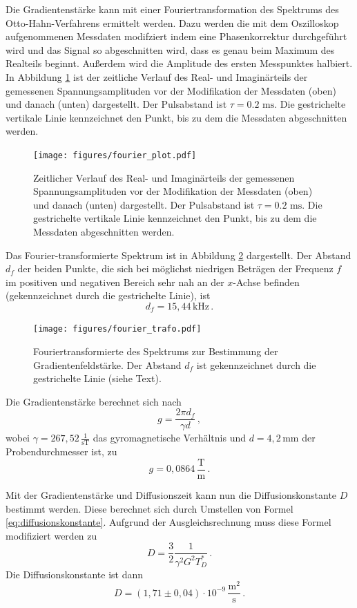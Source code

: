 Die Gradientenstärke kann mit einer Fouriertransformation
des Spektrums des Otto-Hahn-Verfahrens ermittelt werden. 
Dazu werden die mit dem Oszilloskop aufgenommenen Messdaten modifziert indem eine Phasenkorrektur durchgeführt wird und das Signal so 
abgeschnitten wird, dass es genau beim Maximum des Realteils beginnt. Außerdem wird die Amplitude des ersten
Messpunktes halbiert.
In Abbildung \ref{fig:fourier_plot} ist der zeitliche Verlauf des Real- und Imaginärteils der gemessenen 
Spannungsamplituden vor der Modifikation der Messdaten (oben) und danach (unten) dargestellt. 
Der Pulsabstand ist $\tau = 0.2 \text{ ms}$. Die gestrichelte vertikale Linie kennzeichnet den Punkt, bis zu 
dem die Messdaten abgeschnitten werden.
\begin{figure}
    \centering
    \texttt{[image: figures/fourier\_plot.pdf]}
    \caption{Zeitlicher Verlauf des Real- und Imaginärteils der gemessenen 
    Spannungsamplituden vor der Modifikation der Messdaten (oben) und danach (unten) dargestellt. 
    Der Pulsabstand ist $\tau = 0.2 \text{ ms}$. Die gestrichelte vertikale Linie kennzeichnet den Punkt, bis zu 
    dem die Messdaten abgeschnitten werden.}
    \label{fig:fourier_plot}
\end{figure}
Das Fourier-transformierte Spektrum ist in Abbildung \ref{fig:fourier_trafo} dargestellt. Der Abstand $d_f$ der 
beiden Punkte, die sich bei möglichst niedrigen Beträgen der Frequenz $f$ im positiven und negativen Bereich
sehr nah an der $x$-Achse befinden (gekennzeichnet durch die gestrichelte Linie), ist
\begin{equation*}
    d_f = 15,44 \, \text{kHz} \, .
\end{equation*}
\begin{figure}
    \centering
    \texttt{[image: figures/fourier\_trafo.pdf]}
    \caption{Fouriertransformierte des Spektrums zur Bestimmung der Gradientenfeldstärke.
    Der Abstand $d_f$ ist gekennzeichnet durch die gestrichelte Linie (siehe Text).}
    \label{fig:fourier_trafo}
\end{figure}
Die Gradientenstärke berechnet sich nach
\begin{equation*}
    g = \frac{2 \pi d_f}{\gamma d} \, ,
\end{equation*}
wobei $\gamma = 267,52 \, \frac{1}{\text{sT}}$ das gyromagnetische Verhältnis \cite{SciPy} und
$d = 4,2 \, \text{mm}$ der Probendurchmesser ist,
zu 
\begin{equation*}
    g = 0,0864 \, \frac{\text{T}}{\text{m}} \, .
\end{equation*}

Mit der Gradientenstärke und Diffusionszeit kann nun die Diffusionskonstante $D$ bestimmt werden. 
Diese berechnet sich durch Umstellen von Formel \ref{eq:diffusionskonstante}. Aufgrund der Ausgleichsrechnung 
muss diese Formel modifiziert werden zu 
\begin{equation*}
    D = \frac{3}{2} \frac{1}{\gamma^2 G^2 T_D^*} \, .
\end{equation*}
Die Diffusionskonstante ist dann 
\begin{equation*}
    D = (1,71 \pm 0,04) \cdot 10^{-9} \, \frac{\text{m}^2}{\text{s}} \, .
\end{equation*}
